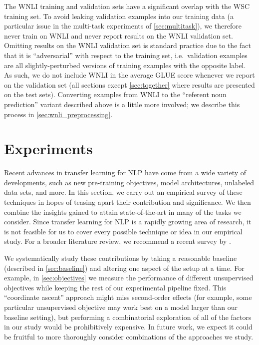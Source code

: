 The WNLI training and validation sets have a significant overlap with the WSC training set. To avoid leaking validation examples into our training data (a particular issue in the multi-task experiments of \ref{sec:multitask}), we therefore never train on WNLI and never report results on the WNLI validation set. Omitting results on the WNLI validation set is standard practice \citep{devlin2018bert} due to the fact that it is ``adversarial'' with respect to the training set, i.e.\ validation examples are all slightly-perturbed versions of training examples with the opposite label. As such, we do not include WNLI in the average GLUE score whenever we report on the validation set (all sections except \ref{sec:together} where results are presented on the test sets). Converting examples from WNLI to the ``referent noun prediction'' variant described above is a little more involved; we describe this process in \ref{sec:wnli_preprocessing}.

\section{Experiments}
\label{sec:experiments}

Recent advances in transfer learning for NLP have come from a wide variety of developments, such as new pre-training objectives, model architectures, unlabeled data sets, and more. In this section, we carry out an empirical survey of these techniques in hopes of teasing apart their contribution and significance. We then combine the insights gained to attain state-of-the-art in many of the tasks we consider. Since transfer learning for NLP is a rapidly growing area of research, it is not feasible for us to cover every possible technique or idea in our empirical study. For a broader literature review, we recommend a recent survey by \cite{ruder2019transfer}.

We systematically study these contributions by taking a reasonable baseline (described in \ref{sec:baseline}) and altering one aspect of the setup at a time. For example, in \ref{sec:objectives} we measure the performance of different unsupervised objectives while keeping the rest of our experimental pipeline fixed. This ``coordinate ascent'' approach might miss second-order effects (for example, some particular unsupervised objective may work best on a model larger than our baseline setting), but performing a combinatorial exploration of all of the factors in our study would be prohibitively expensive. In future work, we expect it could be fruitful to more thoroughly consider combinations of the approaches we study.

